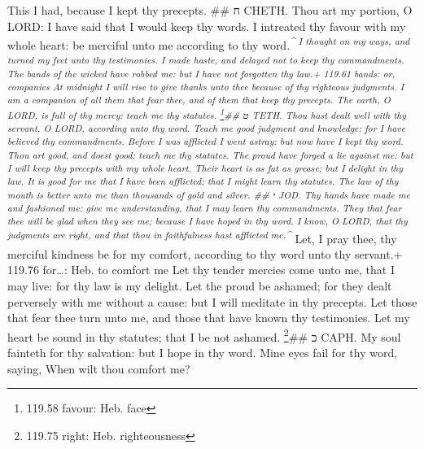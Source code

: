  This I had, because I kept thy precepts. \#\# ח CHETH.
 Thou art my portion, O LORD: I have said that I would keep
thy words.  I intreated thy favour with my whole heart: be
merciful unto me according to thy word.\textsuperscript{\emph{\^{}
 I thought on my ways, and turned my feet unto thy
testimonies.  I made haste, and delayed not to keep thy
commandments.  The bands of the wicked have robbed me: but
I have not forgotten thy law.+ 119.61 bands: or, companies 
At midnight I will rise to give thanks unto thee because of thy
righteous judgments.  I am a companion of all them that
fear thee, and of them that keep thy precepts.  The earth,
O LORD, is full of thy mercy: teach me thy statutes. \footnote{119.58
  favour: Heb. face}\#\# ט TETH.  Thou hast dealt well with
thy servant, O LORD, according unto thy word.  Teach me
good judgment and knowledge: for I have believed thy commandments.
 Before I was afflicted I went astray: but now have I kept
thy word.  Thou art good, and doest good; teach me thy
statutes.  The proud have forged a lie against me: but I
will keep thy precepts with my whole heart.  Their heart is
as fat as grease; but I delight in thy law.  It is good for
me that I have been afflicted; that I might learn thy statutes.
 The law of thy mouth is better unto me than thousands of
gold and silver. \#\# י JOD.  Thy hands have made me and
fashioned me: give me understanding, that I may learn thy commandments.
 They that fear thee will be glad when they see me; because
I have hoped in thy word.  I know, O LORD, that thy
judgments are right, and that thou in faithfulness hast afflicted
me.\^{}}}  Let, I pray thee, thy merciful kindness be for
my comfort, according to thy word unto thy servant.+ 119.76 for\ldots:
Heb. to comfort me  Let thy tender mercies come unto me,
that I may live: for thy law is my delight.  Let the proud
be ashamed; for they dealt perversely with me without a cause: but I
will meditate in thy precepts.  Let those that fear thee
turn unto me, and those that have known thy testimonies. 
Let my heart be sound in thy statutes; that I be not ashamed.
\footnote{119.75 right: Heb. righteousness}\#\# כ CAPH.  My
soul fainteth for thy salvation: but I hope in thy word. 
Mine eyes fail for thy word, saying, When wilt thou comfort me?
